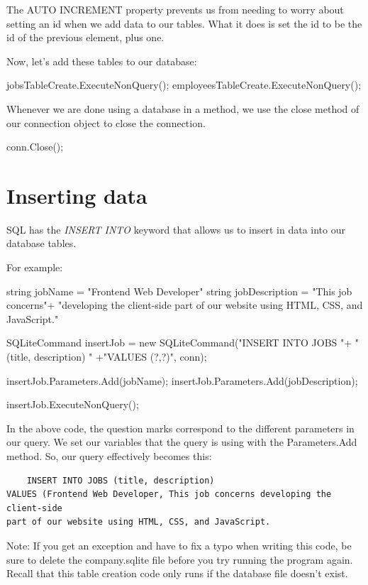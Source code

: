 \documentclass[oneside, openany] {book}
\begin{document}
The AUTO INCREMENT property prevents us from needing to worry about setting an id when we add data to our tables. What it does is set the id to be the id of the previous element, plus one.

Now, let's add these tables to our database:
\begin{CSharp}
jobsTableCreate.ExecuteNonQuery();
employeesTableCreate.ExecuteNonQuery();
\end{CSharp}
Whenever we are done using a database in a method, we use the close method of our connection object to close the connection.

\begin{CSharp}
conn.Close();
\end{CSharp}
\section{Inserting data}
SQL has the \emph{INSERT INTO} keyword that allows us to insert in data into our database tables.

For example:
\begin{CSharp}

string jobName = "Frontend Web Developer"
string jobDescription = "This job concerns"+
"developing the client-side part of our website using HTML, CSS, and JavaScript."
    
SQLiteCommand insertJob = new SQLiteCommand("INSERT INTO JOBS "+ "(title, description) "
+"VALUES (?,?)", conn);

insertJob.Parameters.Add(jobName);
insertJob.Parameters.Add(jobDescription);

insertJob.ExecuteNonQuery();
\end{CSharp}
In the above code, the question marks correspond to the different parameters in our query. We set our variables that the query is using with the Parameters.Add method. So, our query effectively becomes this:

\begin{verbatim}
    INSERT INTO JOBS (title, description)
VALUES (Frontend Web Developer, This job concerns developing the client-side
part of our website using HTML, CSS, and JavaScript.
\end{verbatim}

Note: If you get an exception and have to fix a typo when writing this code, be sure to delete the company.sqlite file before you try running the program again. Recall that this table creation code only runs if the database file doesn't exist.
\end{document}
